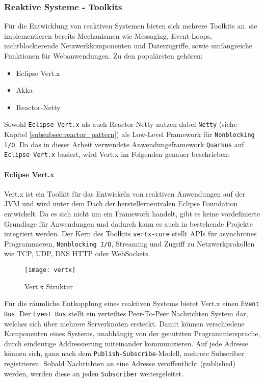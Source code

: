 \subsubsection{Reaktive Systeme - Toolkits}
\label{subsubsec:reaktive_systeme}
Für die Entwicklung von reaktiven Systemen bieten sich mehrere Toolkits an.
sie implementieren bereits Mechanismen wie Messaging, Event Loops,
nichtblockierende Netzwerkkomponenten und Dateizugriffe, sowie umfangreiche Funktionen für Webanwendungen.
Zu den populärsten gehören:
\begin{itemize}
  \item Eclipse Vert.x \parencite{Vert.x}
  \item Akka \parencite{Akka}
  \item Reactor-Netty \parencite{ProjectReactor}
\end{itemize}
Sowohl \verb|Eclipse Vert.x| als auch Reactor-Netty nutzen dabei \verb|Netty|
(siehe Kapitel \ref{subsubsec:reactor_pattern}) als Low-Level Framework für \verb|Nonblocking I/O|.
Da das in dieser Arbeit verwendete Anwendungsframework \verb|Quarkus| auf \verb|Eclipse Vert.x| basiert, wird Vert.x im Folgenden genauer beschrieben:

\paragraph{Eclipse Vert.x}
Vert.x ist ein Toolkit für das Entwickeln von reaktiven Anwendungen auf der JVM und wird unter dem Dach der herstellerneutralen Eclipse Foundation entwickelt.
Da es sich nicht um ein Framework handelt, gibt es keine vordefinierte Grundlage für Anwendungen und dadurch kann es auch in bestehende Projekte
integriert werden.
Der Kern des Toolkits \verb|vertx-core| stellt APIs für asynchrones Programmieren, \verb|Nonblocking I/O|, Streaming und Zugriff zu
Netzwerkprokollen wie TCP, UDP, DNS HTTP oder WebSockets.
\begin{figure}[ht!]
  \centering
  \texttt{[image: vertx]}
  \caption{Vert.x Struktur \parencite{Ponge2020}}
  \label{fig:vertx}
\end{figure}

Für die räumliche Entkopplung eines reaktiven Systems bietet Vert.x einen \verb|Event Bus|.
Der \verb|Event Bus| stellt ein verteiltes Peer-To-Peer Nachrichten System dar, welches sich über mehrere Serverknoten ersteckt.
Damit können verschiedene Komponenten eines Systems, unabhängig von der genutzten Programmiersprache, durch eindeutige Addressierung miteinander kommunizieren.
Auf jede Adresse können sich, ganz nach dem \verb|Publish-Subscribe|-Modell, mehrere Subscriber registrieren. Sobald Nachrichten an eine
Adresse veröffentlicht (published) werden, werden diese an jeden \verb|Subscriber| weitergeleitet.

